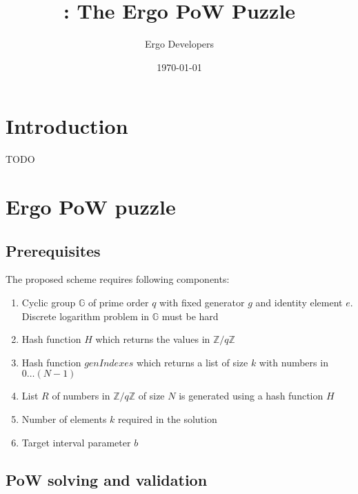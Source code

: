 \documentclass[]{article}
\begin{document}
    \title{\Name: The Ergo PoW Puzzle}

    \author{Ergo Developers}

    \date{\today}
    \maketitle



    \section{Introduction}

    TODO

    \section{Ergo PoW puzzle}

    \subsection{Prerequisites}
    The proposed scheme requires following components:
    \begin{enumerate}
        \item Cyclic group $\mathbb{G}$ of prime order $q$ with fixed generator $g$
        and identity element $e$. Discrete logarithm problem in $\mathbb{G}$ must be hard
        \item Hash function $H$ which returns the values in $\mathbb{Z}/q\mathbb{Z}$
        \item Hash function $genIndexes$ which returns a list of size $k$
        with numbers in $0\dots (N-1)$
        \item List $R$ of numbers in $\mathbb{Z}/q\mathbb{Z}$ of size $N$ is generated
        using a hash function $H$
        \item Number of elements $k$ required in the solution
        \item Target interval parameter $b$
    \end{enumerate}

    \subsection{PoW solving and validation}
\end{document}
